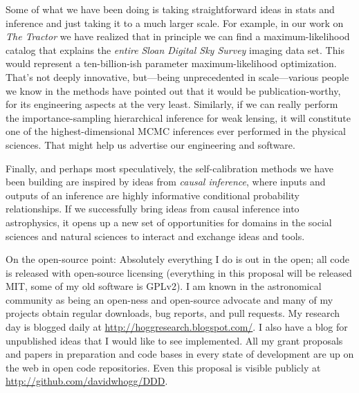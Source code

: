 \documentclass[11pt, letterpaper]{article}
\begin{document}
Some of what we have been doing is taking straightforward ideas in
stats and inference and just taking it to a much larger scale.
For example, in our work on \textsl{The Tractor} we have realized that
in principle we can find a maximum-likelihood catalog that explains
the \emph{entire} \textsl{Sloan Digital Sky Survey} imaging data set.
This would represent a ten-billion-ish parameter maximum-likelihood
optimization.
That's not deeply innovative, but---being unprecedented in
scale---various people we know in the methods have pointed out that it
would be publication-worthy, for its engineering aspects at the very
least.
Similarly, if we can really perform the importance-sampling
hierarchical inference for weak lensing, it will constitute one of the
highest-dimensional MCMC inferences ever performed in the physical
sciences.
That might help us advertise our engineering and software.

Finally, and perhaps most speculatively, the self-calibration methods
we have been building are inspired by ideas from \emph{causal
  inference}, where inputs and outputs of an inference are highly
informative conditional probability relationships.
If we successfully bring ideas from causal inference into
astrophysics, it opens up a new set of opportunities for domains in
the social sciences and natural sciences to interact and exchange
ideas and tools.

On the open-source point:
Absolutely everything I do is out in the open; all code is released
with open-source licensing (everything in this proposal will be
released MIT, some of my old software is GPLv2).
I am known in the astronomical community as being an open-ness and
open-source advocate and many of my projects obtain regular downloads,
bug reports, and pull requests.
My research day is blogged daily at
\url{http://hoggresearch.blogspot.com/}.
I also have a blog for unpublished ideas that I would like to see
implemented.
All my grant proposals and papers in preparation and code bases in
every state of development are up on the web in open code
repositories.
Even this proposal is visible publicly at
\url{http://github.com/davidwhogg/DDD}.
\end{document}
